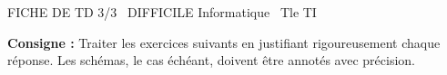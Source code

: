 \documentclass[11pt]{article}
\begin{document}
\begin{tcolorbox}[enhanced,colback=popink,colframe=popink,arc=10pt,boxrule=0pt,left=12pt,right=12pt,top=9pt,bottom=9pt]
{\color{white}\popxbold\small FICHE DE TD 3/3 \textbullet\ DIFFICILE \hfill Informatique \textbullet\ Tle TI\par}
\end{tcolorbox}
\vspace{4pt}
\noindent \textbf{Consigne :} Traiter les exercices suivants en justifiant rigoureusement chaque réponse. Les schémas, le cas échéant, doivent être annotés avec précision.
\end{document}
